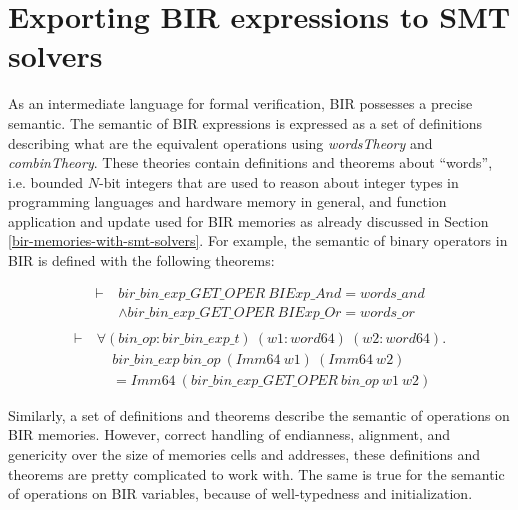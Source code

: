 \documentclass{kththesis}
\begin{document}
{\section{Exporting BIR expressions to SMT solvers} \label{exporting-bir-to-smt}

As an intermediate language for formal verification, \gls{BIR} possesses a precise semantic. The semantic of BIR expressions is expressed as a set of definitions describing what are the equivalent operations using \textit{wordsTheory} and \textit{combinTheory}. These theories contain definitions and theorems about ``words'', i.e. bounded $N$-bit integers that are used to reason about integer types in programming languages and hardware memory in general, and function application and update used for BIR memories as already discussed in Section \ref{bir-memories-with-smt-solvers}. For example, the semantic of binary operators in BIR is defined with the following theorems\footnotemark:


\begin{small}
    \begin{equation}
        \begin{split}
            \vdash~&bir\_bin\_exp\_GET\_OPER~BIExp\_And = words\_and\\
                   &\land bir\_bin\_exp\_GET\_OPER~BIExp\_Or = words\_or\\
        \end{split}
        \label{bir_bin_exp_GET_OPER_def}
    \end{equation}
    \begin{equation}
        \begin{split}
            \vdash~&\forall (bin\_op :bir\_bin\_exp\_t)~(w1 :word64)~(w2 :word64).\\
                   &~~~~~bir\_bin\_exp~bin\_op~(Imm64~w1)~(Imm64~w2)\\
                   &~~~~~= Imm64~(bir\_bin\_exp\_GET\_OPER~bin\_op~w1~w2)
        \end{split}
        \label{bir_bin_exp_def}
    \end{equation}
\end{small}

Similarly, a set of definitions and theorems describe the semantic of operations on BIR memories. However, correct handling of endianness, alignment, and genericity over the size of memories cells and addresses, these definitions and theorems are pretty complicated to work with. The same is true for the semantic of operations on BIR variables, because of well-typedness and initialization.

}
\end{document}
